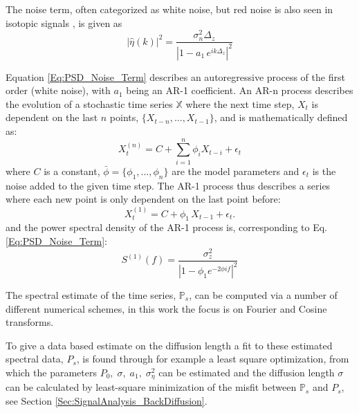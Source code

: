 \documentclass[../../CompleteThesis2/Complete_2ndDraft]{subfiles}
\begin{document}
The noise term, often categorized as white noise, but red noise is also seen in isotopic signals \cite{Holme2018}, is given as
\begin{equation}
	|\hat{\eta}(k)|^2 = \frac{\sigma_n^2 \Delta_z}{|1 - a_1 \, e^{ik\Delta_z}|^2}
	\label{Eq:PSD_Noise_Term}
\end{equation}

Equation \ref{Eq:PSD_Noise_Term} describes an autoregressive process of the first order (white noise), with $a_1$ being an AR-1 coefficient. An AR-n process describes the evolution of a stochastic time series $\mathbb{X}$ where the next time step, $X_t$ is dependent on the last $n$ points, $\{X_{t-n},...,X_{t-1}\}$, and is mathematically defined as:
\begin{equation}
	X_t^{(n)} = C + \sum_{i=1}^{n}\phi_i X_{t-i} + \epsilon_t
	\label{Eq:AR-n}
\end{equation}
where $C$ is a constant, $\bar{\phi} = \{\phi_1,...,\phi_{n}\}$ are the model parameters and $\epsilon_t$ is the noise added to the given time step. The AR-1 process thus describes a series where each new point is only dependent on the last point before:
\begin{equation}
	X_t^{(1)} = C + \phi_{1}\, X_{t-1} + \epsilon_t.
	\label{Eq:AR-1}
\end{equation} 
and the power spectral density of the AR-1 process is, corresponding to Eq. \ref{Eq:PSD_Noise_Term}:
\begin{equation}
	S^{(1)}(f) = \frac{\sigma_z^2}{|1 - \phi_{1}e^{-2\phi i f}|^2}
\end{equation}

The spectral estimate of the time series, $\mathbb{P}_s$, can be computed via a number of different numerical schemes, in this work the focus is on Fourier and Cosine transforms. 



To give a data based estimate on the diffusion length a fit to these estimated spectral data, $P_s$, is found through for example a least square optimization, from which the parameters $P_0, \; \sigma, \; a_1, \; \sigma_{\eta}^2$ can be estimated and the diffusion length $\sigma$ can be calculated by least-square minimization of the misfit between $\mathbb{P}_s$ and $P_s$, see Section \ref{Sec:SignalAnalysis_BackDiffusion}.
\end{document}
